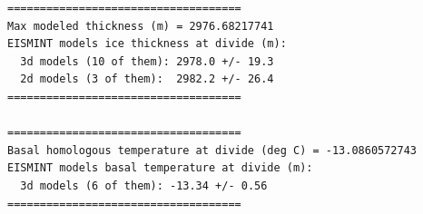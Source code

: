 \begin{verbatim}
====================================
Max modeled thickness (m) = 2976.68217741
EISMINT models ice thickness at divide (m):
  3d models (10 of them): 2978.0 +/- 19.3
  2d models (3 of them):  2982.2 +/- 26.4
====================================

====================================
Basal homologous temperature at divide (deg C) = -13.0860572743
EISMINT models basal temperature at divide (m):
  3d models (6 of them): -13.34 +/- 0.56
====================================
\end{verbatim}





